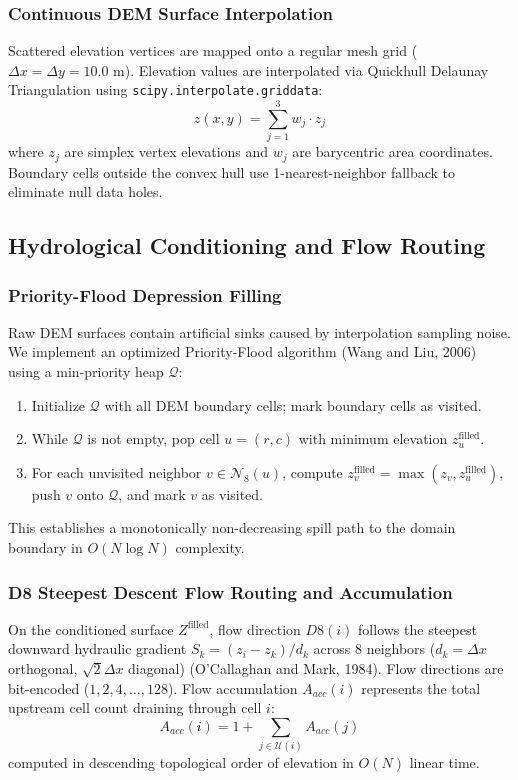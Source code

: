 \documentclass[manuscript,screen,review]{acmart}
\begin{document}
\subsubsection{Continuous DEM Surface Interpolation}
Scattered elevation vertices are mapped onto a regular mesh grid ($\Delta x = \Delta y = 10.0\text{ m}$). Elevation values are interpolated via Quickhull Delaunay Triangulation using \texttt{scipy.interpolate.griddata}:
\begin{equation}
    z(x, y) = \sum_{j=1}^3 w_j \cdot z_j
\end{equation}
where $z_j$ are simplex vertex elevations and $w_j$ are barycentric area coordinates. Boundary cells outside the convex hull use 1-nearest-neighbor fallback to eliminate null data holes.

\subsection{Hydrological Conditioning and Flow Routing}

\subsubsection{Priority-Flood Depression Filling}
Raw DEM surfaces contain artificial sinks caused by interpolation sampling noise. We implement an optimized Priority-Flood algorithm (Wang and Liu, 2006) using a min-priority heap $\mathcal{Q}$:
\begin{enumerate}
    \item Initialize $\mathcal{Q}$ with all DEM boundary cells; mark boundary cells as visited.
    \item While $\mathcal{Q}$ is not empty, pop cell $u = (r, c)$ with minimum elevation $z_u^{\text{filled}}$.
    \item For each unvisited neighbor $v \in \mathcal{N}_8(u)$, compute $z_v^{\text{filled}} = \max(z_v, z_u^{\text{filled}})$, push $v$ onto $\mathcal{Q}$, and mark $v$ as visited.
\end{enumerate}
This establishes a monotonically non-decreasing spill path to the domain boundary in $O(N \log N)$ complexity.

\subsubsection{D8 Steepest Descent Flow Routing and Accumulation}
On the conditioned surface $Z^{\text{filled}}$, flow direction $D8(i)$ follows the steepest downward hydraulic gradient $S_k = (z_i - z_k) / d_k$ across 8 neighbors ($d_k = \Delta x$ orthogonal, $\sqrt{2}\Delta x$ diagonal) (O'Callaghan and Mark, 1984). Flow directions are bit-encoded ($1, 2, 4, \dots, 128$). Flow accumulation $A_{acc}(i)$ represents the total upstream cell count draining through cell $i$:
\begin{equation}
    A_{acc}(i) = 1 + \sum_{j \in \mathcal{U}(i)} A_{acc}(j)
\end{equation}
computed in descending topological order of elevation in $O(N)$ linear time.
\end{document}
